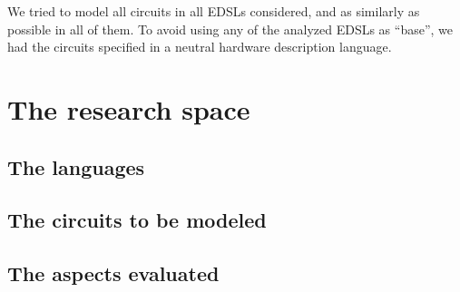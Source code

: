 \documentclass[a4paper]{article}
\begin{document}
        We tried to model all circuits in all EDSLs considered, and as similarly as possible in
        all of them. To avoid using any of the analyzed EDSLs as ``base'', we had the circuits
        specified in a neutral hardware description language.


    \section{The research space}
    \label{sec:languages}

        \subsection{The languages}
        \label{subsec:languages}

        \subsection{The circuits to be modeled}
        \label{subsec:circuits}

        \subsection{The aspects evaluated}
        \label{subsec:aspects}
\end{document}
